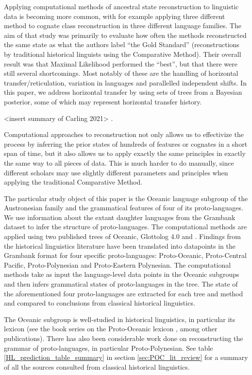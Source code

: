 \documentclass[a4paper,10pt]{article} %
\begin{document}
Applying computational methods of ancestral state reconstruction to linguistic data is becoming more common, with for example \citet{jager2018using} applying three different method to cognate class reconstruction in three different language families. The aim of that study was primarily to evaluate how often the methods reconstructed the same state as what the authors label ``the Gold Standard'' (reconstructions by traditional historical linguists using the Comparative Method). Their overall result was that Maximal Likelihood performed the ``best'', but that there were still several shortcomings. Most notably of these are the handling of horizontal transfer/reticulation, variation in languages and parallelled independent shifts. In this paper, we address horizontal transfer by using sets of trees from a Bayesian posterior, some of which may represent horizontal transfer history.

<insert summary of Carling 2021> \citet{carling2021reconstructing}. 

Computational approaches to reconstruction not only allows us to effectivize the process by inferring the prior states of hundreds of features or cognates in a short span of time, but it also allows us to apply exactly the same principles in exactly the same way to all pieces of data. This is much harder to do manually, since different scholars may use slightly different parameters and principles when applying the traditional Comparative Method. 

The particular study object of this paper is the Oceanic language subgroup of the Austronesian family and the grammatical features of four of its proto-languages. We use information about the extant daughter languages from the Grambank dataset \citep{grambankwebsite} to infer the structure of proto-languages. The computational methods are applied using two published trees of Oceanic, Glottolog 4.0 and \citet{grayetal_2009}. Findings from the historical linguistics literature have been translated into datapoints in the Grambank format for four specific proto-languages: Proto-Oceanic, Proto-Central Pacific, Proto-Polynesian and Proto-Eastern Polynesian. The computational methods take as input the language-level data points in the Oceanic subgroups and then infers grammatical states of proto-languages in the tree. The state of the aforementioned four proto-languages are extracted for each tree and method and compared to conclusions from classical historical linguistics.

The Oceanic subgroup is well-studied in historical linguistics, in particular its lexicon (see the book series on the Proto-Oceanic lexicon \citep{protooceanicvol1, protooceanicvol2, protooceanicvol3, protooceanicvol4, protooceanicvol5}, among other publications). There has also been considerable work done on reconstructing the grammar of proto-languages, in particular Proto-Polynesian. See table \ref{HL_prediction_table_summary} in section \ref{sec:POC_lit_review} for a summary of all the sources consulted from classical historical linguistics.
\end{document}
